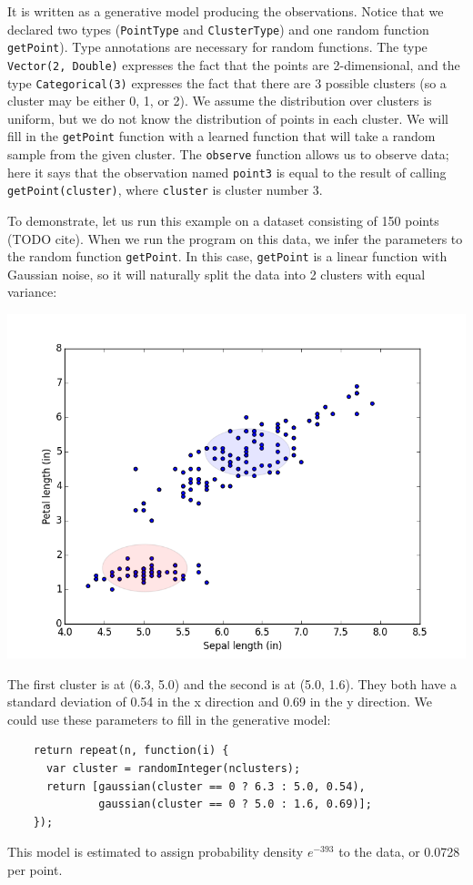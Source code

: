 \documentclass{article}
\begin{document}
  It is written as a generative model producing the observations.  Notice that
  we declared two types (\texttt{PointType} and \texttt{ClusterType}) and one
  random function \texttt{getPoint}).  Type annotations are necessary for random
  functions.  The type \texttt{Vector(2, Double)} expresses the fact that the
  points are 2-dimensional, and the type \texttt{Categorical(3)} expresses the
  fact that there are 3 possible clusters (so a cluster may be either 0, 1, or
  2).    We assume the distribution over clusters is uniform, but we do not know
  the distribution of points in each cluster.  We will fill in the
  \texttt{getPoint} function with a learned function that will take a random
  sample from the given cluster.  The \texttt{observe} function allows us to
  observe data; here it says that the observation named \texttt{point3} is equal
  to the result of calling \texttt{getPoint(cluster)}, where \texttt{cluster} is
  cluster number 3.


  To demonstrate, let us run this example on a dataset consisting of 150 points (TODO cite).  When we run the program on this data, we infer the parameters to the random function \texttt{getPoint}.
  In this case, \texttt{getPoint} is a linear function with Gaussian noise, so it will naturally
  split the data into 2 clusters with equal variance:
  \begin{center}
    \includegraphics[scale=0.5]{../plots/irisclusters_orig.png}
  \end{center}

  The first cluster is at (6.3, 5.0) and the second is at (5.0, 1.6).  They both
  have a standard deviation of 0.54 in the x direction and 0.69 in the y direction.
  We could use these parameters to fill in the generative model:
  \begin{verbatim}
    return repeat(n, function(i) {
      var cluster = randomInteger(nclusters);
      return [gaussian(cluster == 0 ? 6.3 : 5.0, 0.54),
              gaussian(cluster == 0 ? 5.0 : 1.6, 0.69)];
    });
  \end{verbatim}
  This model is estimated to assign probability density $e^{-393}$ to the data, or 0.0728 per point.
\end{document}
